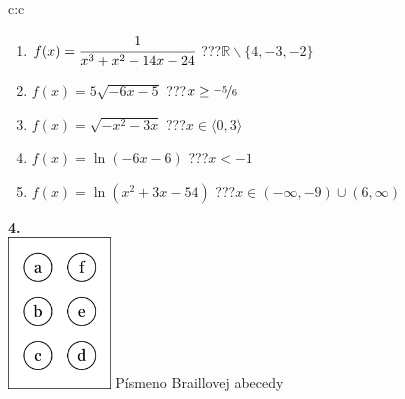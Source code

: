 \documentclass[10pt]{report}
\begin{document}
\begin{tabular}{c:c}
\begin{minipage}[c][104.5mm][t]{0.5\linewidth}
\begin{center}
\begin{minipage}{0.79\linewidth}
\begin{center}
\begin{varwidth}{\linewidth}
\begin{enumerate}
\item $f(x)=\cfrac{1}{x^3+x^2-14x-24}$\quad \dotfill\; ???\;\dotfill \quad $\mathbb{R}\smallsetminus\{4,-3,-2\}$
\item $f(x)=5\sqrt{-6x-5}$\quad \dotfill\; ???\;\dotfill \quad $x\geq\nicefrac{-5}{6}$
\item $f(x)=\sqrt{-x^2-3x}$\quad \dotfill\; ???\;\dotfill \quad $x\in\langle0 , 3\rangle$
\item $f(x)=\ln{(-6x-6)}$\quad \dotfill\; ???\;\dotfill \quad $x<-1$
\item $f(x)=\ln{(x^2+3x-54)}$\quad \dotfill\; ???\;\dotfill \quad $x\in(-\infty , -9)\cup(6 , \infty)$
\end{enumerate}
\end{varwidth}
\end{center}
\end{minipage}
\begin{minipage}{0.20\linewidth}
\begin{center}
{\Huge\bfseries 4.} \\[2mm]
\includegraphics[height=40mm]{../images/braille.png}
{\small Písmeno Braillovej abecedy}
\end{center}
\end{minipage}
\end{center}
\end{minipage}
%
\end{tabular}
\newpage
\thispagestyle{empty}
\end{document}
